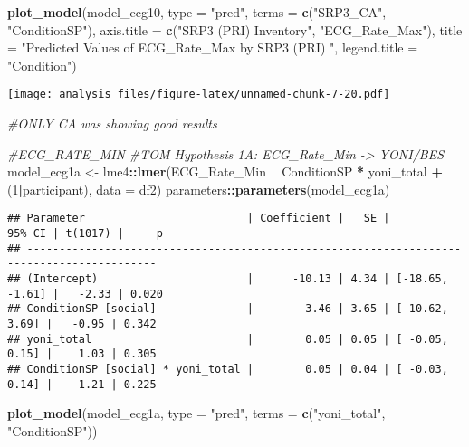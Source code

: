 \documentclass[
]{article}
\newenvironment{Shaded}{\begin{snugshade}}{\end{snugshade}}
\newcommand{\CommentTok}[1]{\textcolor[rgb]{0.56,0.35,0.01}{\textit{#1}}}
\newcommand{\DataTypeTok}[1]{\textcolor[rgb]{0.13,0.29,0.53}{#1}}
\newcommand{\DecValTok}[1]{\textcolor[rgb]{0.00,0.00,0.81}{#1}}
\newcommand{\KeywordTok}[1]{\textcolor[rgb]{0.13,0.29,0.53}{\textbf{#1}}}
\newcommand{\NormalTok}[1]{#1}
\newcommand{\OperatorTok}[1]{\textcolor[rgb]{0.81,0.36,0.00}{\textbf{#1}}}
\newcommand{\StringTok}[1]{\textcolor[rgb]{0.31,0.60,0.02}{#1}}
\begin{document}
\begin{Shaded}
\begin{Highlighting}[]
\KeywordTok{plot_model}\NormalTok{(model_ecg10, }\DataTypeTok{type =} \StringTok{"pred"}\NormalTok{, }\DataTypeTok{terms =} \KeywordTok{c}\NormalTok{(}\StringTok{"SRP3_CA"}\NormalTok{, }\StringTok{"ConditionSP"}\NormalTok{), }\DataTypeTok{axis.title =} \KeywordTok{c}\NormalTok{(}\StringTok{"SRP3 (PRI) Inventory"}\NormalTok{, }\StringTok{"ECG_Rate_Max"}\NormalTok{), }\DataTypeTok{title =} \StringTok{"Predicted Values of ECG_Rate_Max by SRP3 (PRI) "}\NormalTok{, }\DataTypeTok{legend.title =} \StringTok{"Condition"}\NormalTok{)}
\end{Highlighting}
\end{Shaded}

\texttt{[image: analysis\_files/figure-latex/unnamed-chunk-7-20.pdf]}

\begin{Shaded}
\begin{Highlighting}[]
\CommentTok{#ONLY CA was showing good results}



\CommentTok{#ECG_RATE_MIN}
\CommentTok{#TOM Hypothesis 1A: ECG_Rate_Min -> YONI/BES}
\NormalTok{model_ecg1a <-}\StringTok{ }\NormalTok{lme4}\OperatorTok{::}\KeywordTok{lmer}\NormalTok{(ECG_Rate_Min }\OperatorTok{~}\StringTok{ }\NormalTok{ConditionSP }\OperatorTok{*}\StringTok{ }\NormalTok{yoni_total }\OperatorTok{+}\StringTok{ }\NormalTok{(}\DecValTok{1}\OperatorTok{|}\NormalTok{participant), }\DataTypeTok{data =}\NormalTok{ df2)}
\NormalTok{parameters}\OperatorTok{::}\KeywordTok{parameters}\NormalTok{(model_ecg1a)}
\end{Highlighting}
\end{Shaded}

\begin{verbatim}
## Parameter                         | Coefficient |   SE |          95% CI | t(1017) |     p
## ------------------------------------------------------------------------------------------
## (Intercept)                       |      -10.13 | 4.34 | [-18.65, -1.61] |   -2.33 | 0.020
## ConditionSP [social]              |       -3.46 | 3.65 | [-10.62,  3.69] |   -0.95 | 0.342
## yoni_total                        |        0.05 | 0.05 | [ -0.05,  0.15] |    1.03 | 0.305
## ConditionSP [social] * yoni_total |        0.05 | 0.04 | [ -0.03,  0.14] |    1.21 | 0.225
\end{verbatim}

\begin{Shaded}
\begin{Highlighting}[]
\KeywordTok{plot_model}\NormalTok{(model_ecg1a, }\DataTypeTok{type =} \StringTok{"pred"}\NormalTok{, }\DataTypeTok{terms =} \KeywordTok{c}\NormalTok{(}\StringTok{"yoni_total"}\NormalTok{, }\StringTok{"ConditionSP"}\NormalTok{))}
\end{Highlighting}
\end{Shaded}
\end{document}
